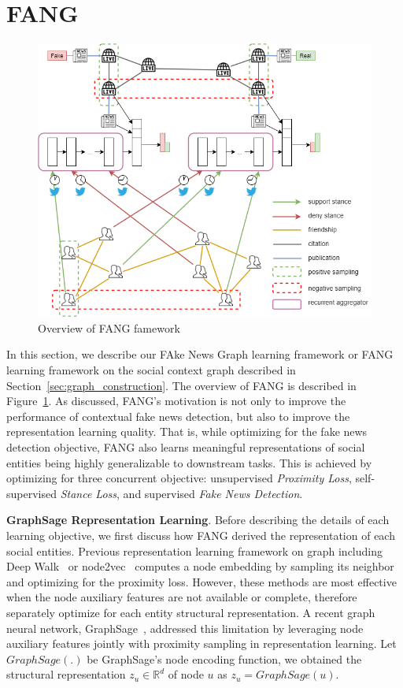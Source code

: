 \documentclass[fyp]{socreport}
\theoremstyle{definition}
\theoremstyle{hypothesis}
\begin{document}
\section{FANG}
\label{sec:fang}

\begin{figure}[t]
\centering
\includegraphics[scale=0.6]{fang.png}
\caption{Overview of FANG famework}
\label{fig:fang_overview}
\end{figure}

In this section, we describe our FAke News Graph learning framework or FANG learning framework on the social context graph described in Section~\ref{sec:graph_construction}. The overview of FANG is described in Figure~\ref{fig:fang_overview}. As discussed, FANG's motivation is not only to improve the performance of contextual fake news detection, but also to improve the representation learning quality. That is, while optimizing for the fake news detection objective, FANG also learns meaningful representations of social entities being highly generalizable to downstream tasks. This is achieved by optimizing for three concurrent objective: unsupervised \textit{Proximity Loss}, self-supervised \textit{Stance Loss}, and supervised \textit{Fake News Detection}.

\textbf{GraphSage Representation Learning}. Before describing the details of each learning objective, we first discuss how FANG derived the representation of each social entities. Previous representation learning framework on graph including Deep Walk~\cite{perozzi2014deepwalk} or node2vec~\cite{grover2016node2vec} computes a node embedding by sampling its neighbor and optimizing for the proximity loss. However, these methods are most effective when the node auxiliary features are not available or complete, therefore separately optimize for each entity structural representation. A recent graph neural network, GraphSage~\cite{Hamilton2017InductiveRL}, addressed this limitation by leveraging node auxiliary features jointly with proximity sampling in representation learning. Let $GraphSage(.)$ be GraphSage's node encoding function, we obtained the structural representation $z_u\in \mathbb{R}^d$ of node $u$ as $z_u=GraphSage(u)$.
\end{document}
